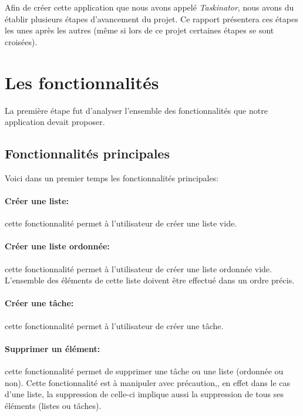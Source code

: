 \documentclass[a4paper,10pt]{article}
\begin{document}
Afin de créer cette application que nous avons appelé \textit{Taskinator}, nous avons du établir plusieurs étapes d'avancement du projet. Ce rapport présentera ces étapes les unes après les autres (même si lors de ce projet certaines étapes se sont croisées).

%

\newpage
\section{Les fonctionnalités}
La première étape fut d'analyser l'ensemble des fonctionnalités que notre application devait proposer. 

\subsection{Fonctionnalités principales}
Voici dans un premier temps les fonctionnalités principales:
\paragraph{Créer une liste:} cette fonctionnalité permet à l'utilisateur de créer une liste vide.
\paragraph{Créer une liste ordonnée:} cette fonctionnalité permet à l'utilisateur de créer une liste ordonnée vide. L'ensemble des éléments de cette liste doivent être effectué dans un ordre précis.
\paragraph{Créer une tâche:} cette fonctionnalité permet à l'utilisateur de créer une tâche.
\paragraph{Supprimer un élément:} cette fonctionnalité permet de supprimer une tâche ou une liste (ordonnée ou non). Cette fonctionnalité est à manipuler avec précaution,, en effet dans le cas d'une liste, la suppression de celle-ci implique aussi la suppression de tous ses éléments (listes ou tâches).
\end{document}
